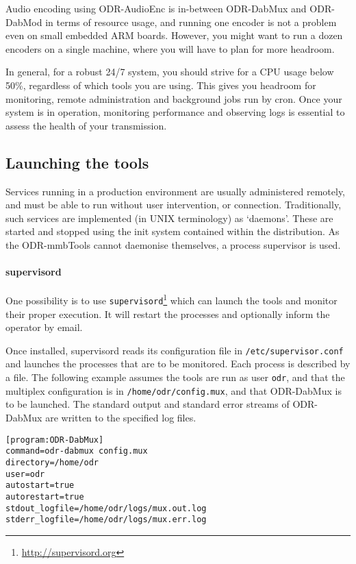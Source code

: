 Audio encoding using ODR-AudioEnc is in-between ODR-DabMux and ODR-DabMod in
terms of resource usage, and running one encoder is not a problem even on small
embedded ARM boards.
However, you might want to run a dozen encoders on a single machine, where you
will have to plan for more headroom.

In general, for a robust 24/7 system, you should strive for a CPU usage below
50\%, regardless of which tools you are using. This gives you headroom for
monitoring, remote administration and background jobs run by cron.
Once your system is in operation, monitoring performance and observing logs is
essential to assess the health of your transmission.


\subsection{Launching the tools}

Services running in a production environment are usually administered remotely,
and must be able to run without user intervention, or connection. Traditionally,
such services are implemented (in UNIX terminology) as `daemons'. These are
started and stopped using the init system contained within the distribution.
As the ODR-mmbTools cannot daemonise themselves, a process supervisor is used.

\paragraph{supervisord}
One possibility is to use
\texttt{supervisord}\footnote{\url{http://supervisord.org}}
which can launch the tools and monitor their proper execution. It will
restart the processes and optionally inform the operator by email.

Once installed, supervisord reads its configuration file in
\texttt{/etc/supervisor.conf}
and launches the processes that are to be monitored. Each process is described
by a file. The following example assumes the tools are run as user \texttt{odr},
and that the multiplex configuration is in \texttt{/home/odr/config.mux}, and
that ODR-DabMux is to be launched.
The standard output and standard error streams of ODR-DabMux are written to the
specified log files.

\begin{lstlisting}
[program:ODR-DabMux]
command=odr-dabmux config.mux
directory=/home/odr
user=odr
autostart=true
autorestart=true
stdout_logfile=/home/odr/logs/mux.out.log
stderr_logfile=/home/odr/logs/mux.err.log
\end{lstlisting}

